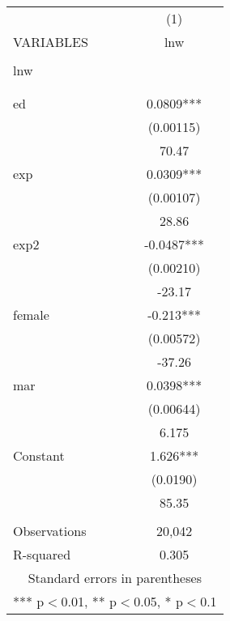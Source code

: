 \begin{tabular}{lc} \hline
 & (1) \\
VARIABLES & lnw \\ \hline
 &  \\
lnw &  \\
 &  \\
 &  \\
ed & 0.0809*** \\
 & (0.00115) \\
 & 70.47 \\
exp & 0.0309*** \\
 & (0.00107) \\
 & 28.86 \\
exp2 & -0.0487*** \\
 & (0.00210) \\
 & -23.17 \\
female & -0.213*** \\
 & (0.00572) \\
 & -37.26 \\
mar & 0.0398*** \\
 & (0.00644) \\
 & 6.175 \\
Constant & 1.626*** \\
 & (0.0190) \\
 & 85.35 \\
 &  \\
Observations & 20,042 \\
 R-squared & 0.305 \\ \hline
\multicolumn{2}{c}{ Standard errors in parentheses} \\
\multicolumn{2}{c}{ *** p$<$0.01, ** p$<$0.05, * p$<$0.1} \\
\end{tabular}
